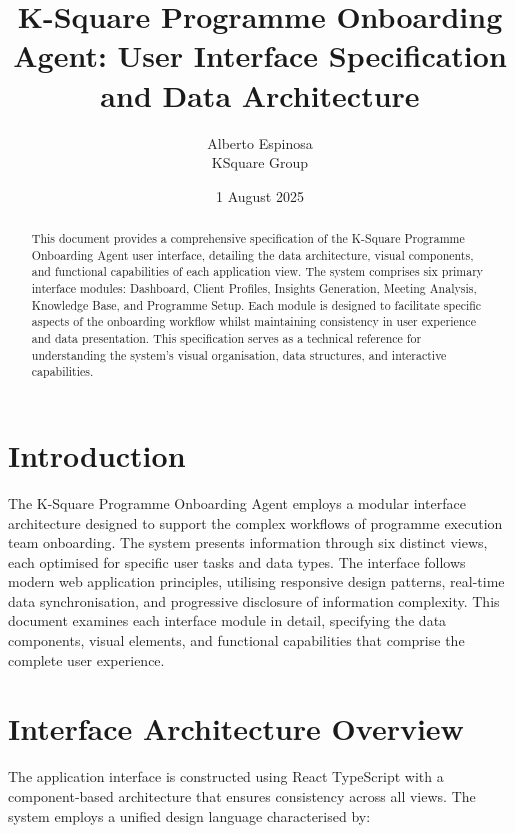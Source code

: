 \documentclass{article}
\begin{document}
\title{K-Square Programme Onboarding Agent: User Interface Specification and Data Architecture}
\author{Alberto Espinosa \\ KSquare Group}
\date{1 August 2025}
\maketitle

\begin{abstract}
This document provides a comprehensive specification of the K-Square Programme Onboarding Agent user interface, detailing the data architecture, visual components, and functional capabilities of each application view. The system comprises six primary interface modules: Dashboard, Client Profiles, Insights Generation, Meeting Analysis, Knowledge Base, and Programme Setup. Each module is designed to facilitate specific aspects of the onboarding workflow whilst maintaining consistency in user experience and data presentation. This specification serves as a technical reference for understanding the system's visual organisation, data structures, and interactive capabilities.
\end{abstract}

\section{Introduction}
The K-Square Programme Onboarding Agent employs a modular interface architecture designed to support the complex workflows of programme execution team onboarding. The system presents information through six distinct views, each optimised for specific user tasks and data types. The interface follows modern web application principles, utilising responsive design patterns, real-time data synchronisation, and progressive disclosure of information complexity. This document examines each interface module in detail, specifying the data components, visual elements, and functional capabilities that comprise the complete user experience.

\section{Interface Architecture Overview}
The application interface is constructed using React TypeScript with a component-based architecture that ensures consistency across all views. The system employs a unified design language characterised by:
\end{document}
